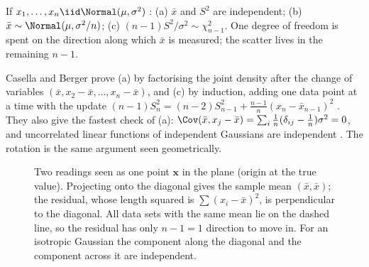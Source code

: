 \begin{keyidea}
If $x_1,\dots,x_n\iid\Normal(\mu,\sigma^2)$ :
(a) $\bar x$ and $S^2$ are independent;
(b) $\bar x\sim\Normal(\mu,\sigma^2/n)$;
(c) $(n-1)S^2/\sigma^2\sim\chi^2_{n-1}$.
One degree of freedom is spent on the direction along which $\bar x$ is measured; the scatter lives in the remaining $n-1$.
\end{keyidea}

Casella and Berger prove (a) by factorising the joint density after the change of variables $(\bar x,x_2-\bar x,\dots,x_n-\bar x)$, and (c) by induction, adding one data point at a time with the update $(n-1)S_n^2=(n-2)S_{n-1}^2+\frac{n-1}{n}(x_n-\bar x_{n-1})^2$ . They also give the fastest check of (a): $\Cov(\bar x,x_j-\bar x)=\sum_i\frac1n(\delta_{ij}-\frac1n)\sigma^2=0$, and uncorrelated linear functions of independent Gaussians are independent . The rotation is the same argument seen geometrically.

\begin{figure}[htbp]
\centering
{}
\caption{Two readings seen as one point $\bm x$ in the plane (origin at the true value). Projecting onto the diagonal gives the sample mean $(\bar x,\bar x)$; the residual, whose length squared is $\sum(x_i-\bar x)^2$, is perpendicular to the diagonal. All data sets with the same mean lie on the dashed line, so the residual has only $n-1=1$ direction to move in. For an isotropic Gaussian the component along the diagonal and the component across it are independent.}
\label{2b:fig:helmert}
\end{figure}

